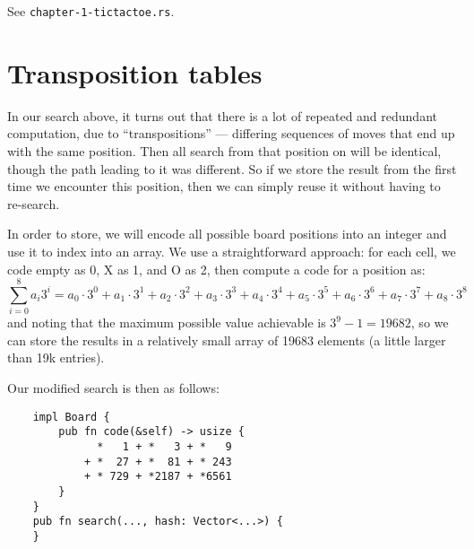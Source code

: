 \documentclass[10pt,dvipdfmx]{report}
\begin{document}
See {\tt chapter-1-tictactoe.rs}.


\section{Transposition tables}

In our search above, it turns out that there is a lot of repeated and
redundant computation, due to ``transpositions'' --- differing sequences of 
moves that end up with the same position.  Then all search from that position
on will be identical, though the path leading to it was different.  So if we
store the result from the first time we encounter this position, then we can
simply reuse it without having to re-search.

In order to store, we will encode all possible board positions into an
integer and use it to index into an array.  We use a straightforward
approach: for each cell, we code empty as 0, X as 1, and O as 2, then
compute a code for a position as:
\[
    \sum_{i=0}^8 a_i 3^i
    = a_0\cdot 3^0 + a_1\cdot 3^1 + a_2\cdot 3^2 +
      a_3\cdot 3^3 + a_4\cdot 3^4 + a_5\cdot 3^5 +
      a_6\cdot 3^6 + a_7\cdot 3^7 + a_8\cdot 3^8
\]
and noting that the maximum possible value achievable is
$3^9-1 = 19682$, so we can store the results in a relatively small array
of 19683 elements (a little larger than 19k entries).

Our modified search is then as follows:
{\scriptsize
\begin{verbatim}
    impl Board {
        pub fn code(&self) -> usize {
              *   1 + *   3 + *   9
            + *  27 + *  81 + * 243
            + * 729 + *2187 + *6561
        }
    }
    pub fn search(..., hash: Vector<...>) {
    }
\end{verbatim}
}


%
%
%
\end{document}
